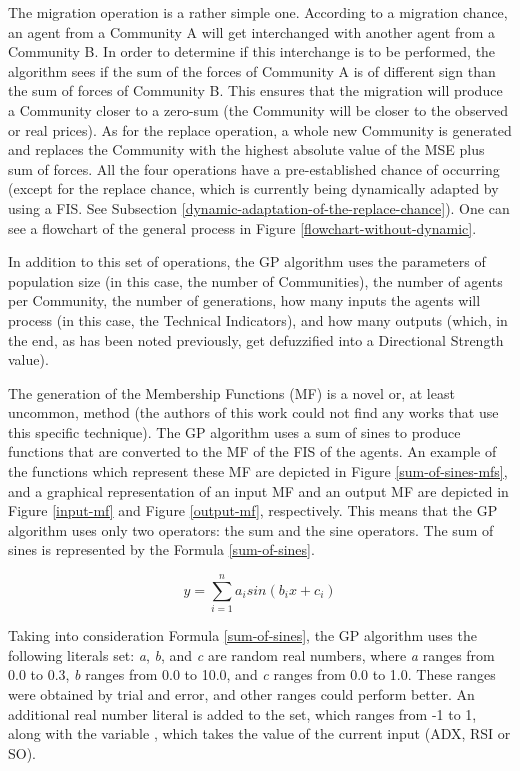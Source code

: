 \documentclass[12pt,journal,draftcls,onecolumn]{IEEEtran}
\begin{document}
The migration operation is a rather simple one. According to a migration chance, an agent from a Community A will get interchanged with another agent from a Community B. In order to determine if this interchange is to be performed, the algorithm sees if the sum of the forces of Community A is of different sign than the sum of forces of Community B. This ensures that the migration will produce a Community closer to a zero-sum (the Community will be closer to the observed or real prices). As for the replace operation, a whole new Community is generated and replaces the Community with the highest absolute value of the MSE plus sum of forces. All the four operations have a pre-established chance of occurring (except for the replace chance, which is currently being dynamically adapted by using a FIS. See Subsection \ref{dynamic-adaptation-of-the-replace-chance}). One can see a flowchart of the general process in Figure \ref{flowchart-without-dynamic}.

In addition to this set of operations, the GP algorithm uses the parameters of population size (in this case, the number of Communities), the number of agents per Community, the number of generations, how many inputs the agents will process (in this case, the Technical Indicators), and how many outputs (which, in the end, as has been noted previously, get defuzzified into a Directional Strength value).

The generation of the Membership Functions (MF) is a novel or, at least uncommon, method (the authors of this work could not find any works that use this specific technique). The GP algorithm uses a sum of sines to produce functions that are converted to the MF of the FIS of the agents. An example of the functions which represent these MF are depicted in Figure \ref{sum-of-sines-mfs}, and a graphical representation of an input MF and an output MF are depicted in Figure \ref{input-mf} and Figure \ref{output-mf}, respectively. This means that the GP algorithm uses only two operators: the sum and the sine operators. The sum of sines is represented by the Formula \ref{sum-of-sines}.

\begin{equation} \label{sum-of-sines}
  y = \sum_{i=1}^{n} a_{i} sin(b_{i}x + c_{i})
\end{equation}

Taking into consideration Formula \ref{sum-of-sines}, the GP algorithm uses the following literals set: \textit{a}, \textit{b}, and \textit{c} are random real numbers, where \textit{a} ranges from 0.0 to 0.3, \textit{b} ranges from 0.0 to 10.0, and \textit{c} ranges from 0.0 to 1.0. These ranges were obtained by trial and error, and other ranges could perform better. An additional real number literal is added to the set, which ranges from -1 to 1, along with the variable , which takes the value of the current input (ADX, RSI or SO).
\end{document}
